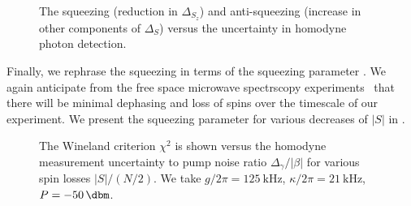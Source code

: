 \begin{figure}[h]
  \centering
  \caption{The squeezing (reduction in $\Delta_{S_z}$) and anti-squeezing
  (increase in other components of $\Delta_S$) versus the uncertainty in
  homodyne photon detection.
  }
  \label{mws:fig:squeezeuncert}
\end{figure}

Finally, we rephrase the squeezing in terms of the squeezing parameter . We again anticipate from the free space microwave spectrscopy
experiments~\cite{WilliamsMagnetic2018} that there will be minimal dephasing
and loss of spins over the timescale of our experiment. We present the
squeezing parameter for various decreases of $|S|$ in .

\begin{figure}[h]
  \centering
  \caption{The Wineland criterion $\chi^2$ is shown versus the homodyne
  measurement uncertainty to pump noise ratio $\Delta_\gamma/|\beta|$ for
  various spin losses $|S|/(N/2)$. We take
  $g/2\pi = \SI{125}{\kilo\hertz}$, $\kappa/2\pi = \SI{21}{\kilo\hertz}$,
  $P=\SI{-50}{\dbm}$. 
  }
  \label{squeeze:fig:wineland}
\end{figure}

